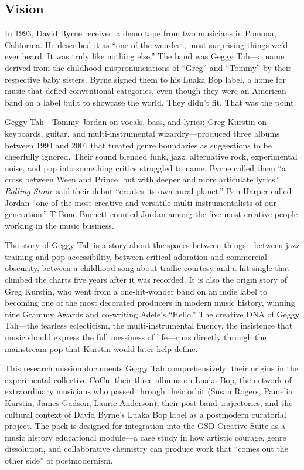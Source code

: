 \documentclass[11pt,letterpaper]{article}
\begin{document}
\subsection{Vision}

In 1993, David Byrne received a demo tape from two musicians in Pomona, California. He described it as ``one of the weirdest, most surprising things we'd ever heard. It was truly like nothing else.'' The band was Geggy Tah---a name derived from the childhood mispronunciations of ``Greg'' and ``Tommy'' by their respective baby sisters. Byrne signed them to his Luaka Bop label, a home for music that defied conventional categories, even though they were an American band on a label built to showcase the world. They didn't fit. That was the point.

Geggy Tah---Tommy Jordan on vocals, bass, and lyrics; Greg Kurstin on keyboards, guitar, and multi-instrumental wizardry---produced three albums between 1994 and 2001 that treated genre boundaries as suggestions to be cheerfully ignored. Their sound blended funk, jazz, alternative rock, experimental noise, and pop into something critics struggled to name. Byrne called them ``a cross between Ween and Prince, but with deeper and more articulate lyrics.'' \textit{Rolling Stone} said their debut ``creates its own aural planet.'' Ben Harper called Jordan ``one of the most creative and versatile multi-instrumentalists of our generation.'' T Bone Burnett counted Jordan among the five most creative people working in the music business.

The story of Geggy Tah is a story about the spaces between things---between jazz training and pop accessibility, between critical adoration and commercial obscurity, between a childhood song about traffic courtesy and a hit single that climbed the charts five years after it was recorded. It is also the origin story of Greg Kurstin, who went from a one-hit-wonder band on an indie label to becoming one of the most decorated producers in modern music history, winning nine Grammy Awards and co-writing Adele's ``Hello.'' The creative DNA of Geggy Tah---the fearless eclecticism, the multi-instrumental fluency, the insistence that music should express the full messiness of life---runs directly through the mainstream pop that Kurstin would later help define.

This research mission documents Geggy Tah comprehensively: their origins in the experimental collective CoCu, their three albums on Luaka Bop, the network of extraordinary musicians who passed through their orbit (Susan Rogers, Pamelia Kurstin, James Gadson, Laurie Anderson), their post-band trajectories, and the cultural context of David Byrne's Luaka Bop label as a postmodern curatorial project. The pack is designed for integration into the GSD Creative Suite as a music history educational module---a case study in how artistic courage, genre dissolution, and collaborative chemistry can produce work that ``comes out the other side'' of postmodernism.
\end{document}
